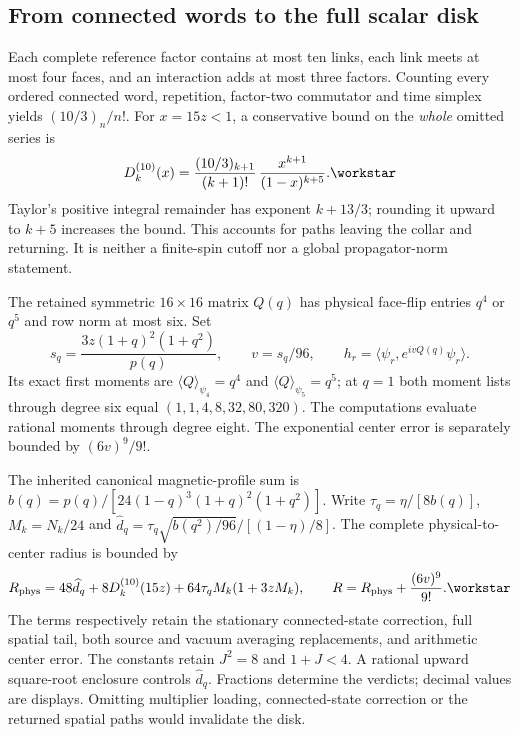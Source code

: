 \subsection{From connected words to the full scalar disk}
Each complete reference factor contains at most ten links, each link meets at most four faces, and an interaction adds at most three factors. Counting every ordered connected word, repetition, factor-two commutator and time simplex yields $(10/3)_n/n!$. For $x=15z<1$, a conservative bound on the \emph{whole} omitted series is
\begin{equation}
D_k^{(10)}(x)=\frac{(10/3)_{k+1}}{(k+1)!}\,
\frac{x^{k+1}}{(1-x)^{k+5}}.\workstar
\label{eq:tail}
\end{equation}
Taylor's positive integral remainder has exponent $k+13/3$; rounding it upward to $k+5$ increases the bound. This accounts for paths leaving the collar and returning. It is neither a finite-spin cutoff nor a global propagator-norm statement.

The retained symmetric $16\times16$ matrix $Q(q)$ has physical face-flip entries $q^4$ or $q^5$ and row norm at most six. Set
\begin{equation}
s_q=\frac{3z(1+q)^2(1+q^2)}{p(q)},\qquad v=s_q/96,\qquad
h_r=\langle\psi_r,e^{ivQ(q)}\psi_r\rangle.
\label{eq:center}
\end{equation}
Its exact first moments are $\langle Q\rangle_{\psi_4}=q^4$ and
$\langle Q\rangle_{\psi_5}=q^5$; at $q=1$ both moment lists through degree six equal $(1,1,4,8,32,80,320)$. The computations evaluate rational moments through degree eight. The exponential center error is separately bounded by $(6v)^9/9!$.

The inherited canonical magnetic-profile sum is
$b(q)=p(q)/[24(1-q)^3(1+q)^2(1+q^2)]$. Write
$\tau_q=\eta/[8b(q)]$, $M_k=N_k/24$ and
$\widehat d_q=\tau_q\sqrt{b(q^2)/96}/[(1-\eta)/8]$.
The complete physical-to-center radius is bounded by
\begin{equation}
R_{\mathrm{phys}}=48\widehat d_q+8D_k^{(10)}(15z)
+64\tau_qM_k(1+3zM_k),\qquad
R=R_{\mathrm{phys}}+\frac{(6v)^9}{9!}.\workstar
\label{eq:disk}
\end{equation}
The terms respectively retain the stationary connected-state correction, full spatial tail, both source and vacuum averaging replacements, and arithmetic center error. The constants retain $J^2=8$ and $1+J<4$. A rational upward square-root enclosure controls $\widehat d_q$. Fractions determine the verdicts; decimal values are displays. Omitting multiplier loading, connected-state correction or the returned spatial paths would invalidate the disk.


